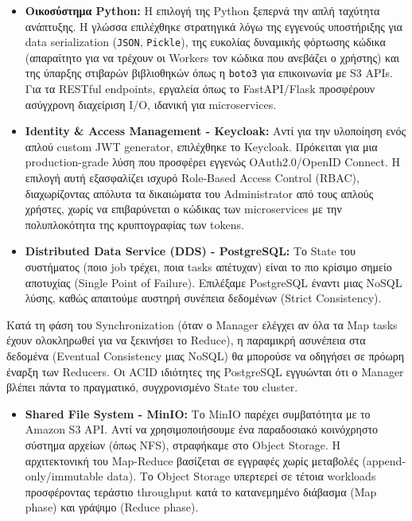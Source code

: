 \documentclass[11pt, a4paper]{article}
\begin{document}
\begin{itemize}
    \item \textbf{Οικοσύστημα Python:} Η επιλογή της Python ξεπερνά την απλή ταχύτητα ανάπτυξης. Η γλώσσα επιλέχθηκε στρατηγικά λόγω της εγγενούς υποστήριξης για data serialization (\texttt{JSON}, \texttt{Pickle}), της ευκολίας δυναμικής φόρτωσης κώδικα (απαραίτητο για να τρέχουν οι Workers τον κώδικα που ανεβάζει ο χρήστης) και της ύπαρξης στιβαρών βιβλιοθηκών όπως η \texttt{boto3} για επικοινωνία με S3 APIs. Για τα RESTful endpoints, εργαλεία όπως το FastAPI/Flask προσφέρουν ασύγχρονη διαχείριση I/O, ιδανική για microservices.

    \item \textbf{Identity \& Access Management - Keycloak:} Αντί για την υλοποίηση ενός απλού custom JWT generator, επιλέχθηκε το Keycloak. Πρόκειται για μια production-grade λύση που προσφέρει εγγενώς OAuth2.0/OpenID Connect. Η επιλογή αυτή εξασφαλίζει ισχυρό Role-Based Access Control (RBAC), διαχωρίζοντας απόλυτα τα δικαιώματα του Administrator από τους απλούς χρήστες, χωρίς να επιβαρύνεται ο κώδικας των microservices με την πολυπλοκότητα της κρυπτογραφίας των tokens.

    \item \textbf{Distributed Data Service (DDS) - PostgreSQL:} Το State του συστήματος (ποιο job τρέχει, ποια tasks απέτυχαν) είναι το πιο κρίσιμο σημείο αποτυχίας (Single Point of Failure). Επιλέξαμε PostgreSQL έναντι μιας NoSQL λύσης, καθώς απαιτούμε αυστηρή συνέπεια δεδομένων (Strict Consistency).
\end{itemize}

\begin{tcolorbox}[colback=LightBlue, colframe=PrimaryColor, title=\textbf{Σχεδιαστική Απόφαση: ACID Transactions vs Eventual Consistency}, arc=4mm]
Κατά τη φάση του Synchronization (όταν ο Manager ελέγχει αν όλα τα Map tasks έχουν ολοκληρωθεί για να ξεκινήσει το Reduce), η παραμικρή ασυνέπεια στα δεδομένα (Eventual Consistency μιας NoSQL) θα μπορούσε να οδηγήσει σε πρόωρη έναρξη των Reducers. Οι ACID ιδιότητες της PostgreSQL εγγυώνται ότι ο Manager βλέπει πάντα το πραγματικό, συγχρονισμένο State του cluster.
\end{tcolorbox}

\begin{itemize}
    \item \textbf{Shared File System - MinIO:} Το MinIO παρέχει συμβατότητα με το Amazon S3 API. Αντί να χρησιμοποιήσουμε ένα παραδοσιακό κοινόχρηστο σύστημα αρχείων (όπως NFS), στραφήκαμε στο Object Storage. Η αρχιτεκτονική του Map-Reduce βασίζεται σε εγγραφές χωρίς μεταβολές (append-only/immutable data). Το Object Storage υπερτερεί σε τέτοια workloads προσφέροντας τεράστιο throughput κατά το κατανεμημένο διάβασμα (Map phase) και γράψιμο (Reduce phase).
\end{itemize}
\end{document}
